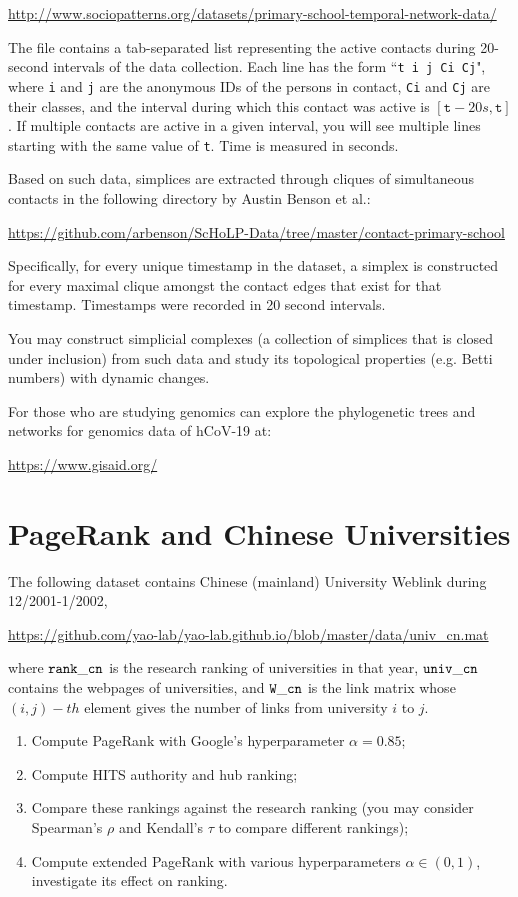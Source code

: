 \documentclass[11pt]{article}
\begin{document}
\url{http://www.sociopatterns.org/datasets/primary-school-temporal-network-data/}

The file contains a tab-separated list representing the active contacts during 20-second intervals of the data collection. Each line has the form ``\texttt{t i j Ci Cj}", where \texttt{i} and \texttt{j} are the anonymous IDs of the persons in contact, \texttt{Ci} and \texttt{Cj} are their classes, and the interval during which this contact was active is $[ \texttt{t} - 20s, \texttt{t} ]$. If multiple contacts are active in a given interval, you will see multiple lines starting with the same value of \texttt{t}. Time is measured in seconds.

Based on such data, simplices are extracted through cliques of simultaneous contacts in the following directory by Austin Benson et al.: 

\url{https://github.com/arbenson/ScHoLP-Data/tree/master/contact-primary-school}

\noindent Specifically, for every unique timestamp in the dataset, a simplex is constructed for every maximal
clique amongst the contact edges that exist for that timestamp. Timestamps were
recorded in 20 second intervals.

You may construct simplicial complexes (a collection of simplices that is closed under inclusion) from such data and study its topological properties (e.g. Betti numbers) with dynamic changes. 

For those who are studying genomics can explore the phylogenetic trees and networks for genomics data of hCoV-19 at: 

\url{https://www.gisaid.org/} 

\section{PageRank and Chinese Universities}

The following dataset contains Chinese (mainland) University Weblink during 12/2001-1/2002,

\url{https://github.com/yao-lab/yao-lab.github.io/blob/master/data/univ_cn.mat}

\noindent where $\tt{rank\_{}cn}$ is the research ranking of universities in that year, $\tt{univ\_{}cn}$ contains the webpages of universities, and $\tt{W\_{}cn}$ is the link matrix whose $(i,j)-th$ element gives the number of links from university
$i$ to $j$. 
 
\begin{enumerate}
\item Compute PageRank with Google's hyperparameter $\alpha=0.85$;
\item Compute HITS authority and hub ranking; 
\item Compare these rankings against the research ranking (you may consider Spearman's $\rho$ and Kendall's $\tau$ to compare different rankings);  
\item Compute extended PageRank with various hyperparameters $\alpha\in (0,1)$, investigate its effect on ranking. 
\end{enumerate} 
\end{document}
